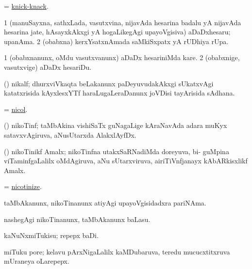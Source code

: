\bentry
{}
\gl{\nA}
\bmng
= \hyperref{kandict_k.pdf}{K}{knick-knack}{knick-knack}. 
\emng
\eentry

\bentry
{}
\gl{\nA}
\bmng
\bnum
\num{1} (manuSayxna, sathxLada, vasutxvina, nijavAda hesarina badalu yA nijavAda hesarina jate, hAsayxkAkxgi yA hogaLikegAgi upayoVgisiva) aDaDxhesaru; upanAma. 
\num{2} (obabxna) kerxYsatxnAmada saMkiSxpatx yA rUDhiya rUpa. 
\enum
\emng
\eentry

\bentry
{}
\gl{\sakirx}
\bmng
\bnum
\num{1} (obabxnanunx, oMdu vasutxvanunx) aDaDx hesariniMda kare. 
\num{2} (obabxnige, vasutxvige) aDaDx hesariDu. 
\enum
\emng
\eentry

\bentry
{}
\gl{\nA}
\bmng
(\Bwvi) nikalf; dhurxviVkaqta beLakanunx paDeyuvudakAkxgi sUkatxvAgi katatxrisida kAyxlesxYTf haraLugaLeraDanunx joVDisi tayArisida sAdhana. 
\emng
\eentry

\bentry
{}
\gl{\nA}
\bmng
= \hyperlink{nicol}{nicol}. 
\emng
\eentry

\bentry
{}
\gl{\nA}
\bmng
(\ravi) nikoTinf; taMbAkina vishiSaTx guNagaLige kAraNavAda adara muKyx satavxvAgiruva,  aNusUtarxda AlakxlAyfDx. 
\emng
\eentry

\bentry
{}
\gl{\nA}
\bmng
(\ravi) nikoTinikf Amalx; nikoTinfna utakxSaRNadiMda doreyuva, bi- guMpina viTaminfgaLalilx oMdAgiruva,  aNu sUtarxviruva, airiTiVnfjanayx kAbARkisxlikf Amalx. 
\emng
\eentry

\bentry
{}
\bmng
= \hyperlink{nicotinize}{nicotinize}. 
\emng
\eentry

\bentry
{}
\gl{\nA}
\bmng
taMbAkanunx, nikoTinanunx atiyAgi upayoVgisidadxra pariNAma. 
\emng
\eentry

\bentry
{}
\gl{\sakirx}
\bmng
nashegAgi nikoTinanunx, taMbAkanunx baLasu. 
\emng
\eentry

\bentry
{}
\gl{\akirx}
\bmng
kaNuNxmiTukisu; repepx baDi. 
\emng

\noindent
\gl{\pagu}
\bmng
{} miTuku pore; kelavu pArxNigaLalilx kaMDubaruva, teredu mucucxtitxruva mUraneya oLarepepx. 
\emng
\eentry

